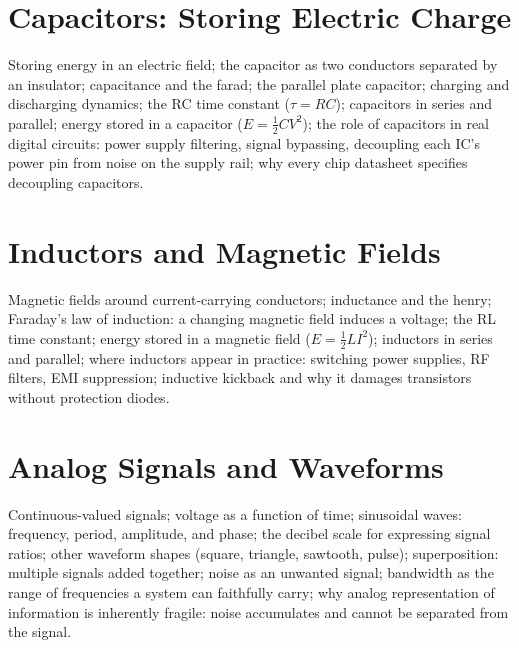 \chapter{Capacitors: Storing Electric Charge}
\label{ch:capacitors}

Storing energy in an electric field; the capacitor as two conductors separated
by an insulator; capacitance and the farad; the parallel plate capacitor;
charging and discharging dynamics; the RC time constant (\(\tau = RC\));
capacitors in series and parallel; energy stored in a capacitor
(\(E = \tfrac{1}{2}CV^2\)); the role of capacitors in real digital circuits:
power supply filtering, signal bypassing, decoupling each IC's power pin from
noise on the supply rail; why every chip datasheet specifies decoupling
capacitors.

\chapter{Inductors and Magnetic Fields}
\label{ch:inductors}

Magnetic fields around current-carrying conductors; inductance and the henry;
Faraday's law of induction: a changing magnetic field induces a voltage;
the RL time constant; energy stored in a magnetic field (\(E = \tfrac{1}{2}LI^2\));
inductors in series and parallel; where inductors appear in practice: switching
power supplies, RF filters, EMI suppression; inductive kickback and why it
damages transistors without protection diodes.

\chapter{Analog Signals and Waveforms}
\label{ch:analog-signals}

Continuous-valued signals; voltage as a function of time; sinusoidal waves:
frequency, period, amplitude, and phase; the decibel scale for expressing
signal ratios; other waveform shapes (square, triangle, sawtooth, pulse);
superposition: multiple signals added together; noise as an unwanted signal;
bandwidth as the range of frequencies a system can faithfully carry;
why analog representation of information is inherently fragile: noise
accumulates and cannot be separated from the signal.



